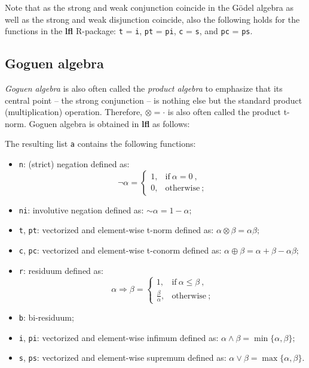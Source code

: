 \documentclass[review]{elsarticle}
\newcommand{\pkg}[1]{\textbf{#1}}
\newcommand{\code}[1]{\texttt{#1}}
\begin{document}
Note that as the strong and weak conjunction coincide in the G\"{o}del algebra as well as the strong and weak disjunction coincide, also the following holds for the  functions in the \pkg{lfl} R-package: \code{t} = \code{i}, \code{pt} = \code{pi}, \code{c} = \code{s}, and \code{pc} = \code{ps}.




\subsection{Goguen algebra}


\emph{Goguen algebra} is also often called the \emph{product algebra} to emphasize that its central point -- the strong conjunction -- is nothing else but the standard product (multiplication) operation. Therefore, $\otimes = \cdot$ is also often called the product t-norm. Goguen algebra is obtained in \pkg{lfl} as follows:
%

%
The resulting list \code{a} contains the following functions:
\begin{itemize}
    \item \code{n}: (strict) negation defined as:
    $$
    \lnot\alpha = \begin{cases}
    1, & \text{if}\ \alpha = 0\ , \\
    0, & \text{otherwise}
\ ;    \end{cases}
    $$
    \item \code{ni}: involutive negation defined as:
    ${\sim}\alpha = 1 - \alpha;$
    \item \code{t}, \code{pt}: vectorized and element-wise t-norm defined as:
    $\alpha \otimes \beta = \alpha\beta;$
    \item \code{c}, \code{pc}: vectorized and element-wise t-conorm defined as: $\alpha \oplus \beta = \alpha + \beta - \alpha\beta;$
    \item \code{r}: residuum defined as:
    $$
    \alpha\Rightarrow\beta = \begin{cases}
    1, & \text{if}\ \alpha\le\beta\ , \\
    \frac{\beta}{\alpha}, & \text{otherwise}\ ;
    \end{cases}
    $$
    \item \code{b}: bi-residuum;
    \item \code{i}, \code{pi}: vectorized and element-wise infimum defined as:
    $\alpha \land \beta = \min\{\alpha, \beta\};$
    \item \code{s}, \code{ps}: vectorized and element-wise supremum defined as:
    $\alpha \lor \beta = \max\{\alpha, \beta\}.$
\end{itemize}
\end{document}
